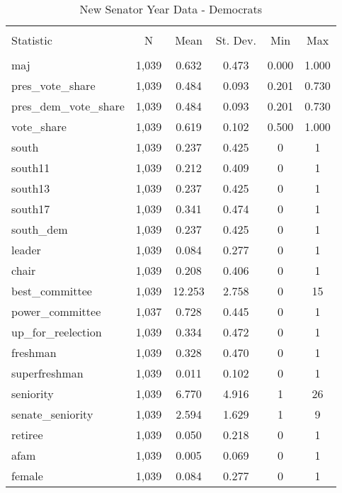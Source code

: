 \documentclass[12pt]{article}
\begin{document}
\begin{table}[!htbp] \centering 
	\caption{New Senator Year Data - Democrats} 
	\begin{tabular}{@{\extracolsep{5pt}}lccccc} 
		\\[-1.8ex]\hline 
		\hline \\[-1.8ex] 
		Statistic & \multicolumn{1}{c}{N} & \multicolumn{1}{c}{Mean} & \multicolumn{1}{c}{St. Dev.} & \multicolumn{1}{c}{Min} & \multicolumn{1}{c}{Max} \\ 
		\hline \\[-1.8ex]  
		maj & 1,039 & 0.632 & 0.473 & 0.000 & 1.000 \\ 
		pres\_vote\_share & 1,039 & 0.484 & 0.093 & 0.201 & 0.730 \\ 
		pres\_dem\_vote\_share & 1,039 & 0.484 & 0.093 & 0.201 & 0.730 \\ 
		vote\_share & 1,039 & 0.619 & 0.102 & 0.500 & 1.000 \\ 
		south & 1,039 & 0.237 & 0.425 & 0 & 1 \\ 
		south11 & 1,039 & 0.212 & 0.409 & 0 & 1 \\ 
		south13 & 1,039 & 0.237 & 0.425 & 0 & 1 \\ 
		south17 & 1,039 & 0.341 & 0.474 & 0 & 1 \\ 
		south\_dem & 1,039 & 0.237 & 0.425 & 0 & 1 \\ 
		leader & 1,039 & 0.084 & 0.277 & 0 & 1 \\ 
		chair & 1,039 & 0.208 & 0.406 & 0 & 1 \\ 
		best\_committee & 1,039 & 12.253 & 2.758 & 0 & 15 \\ 
		power\_committee & 1,037 & 0.728 & 0.445 & 0 & 1 \\ 
		up\_for\_reelection & 1,039 & 0.334 & 0.472 & 0 & 1 \\ 
		freshman & 1,039 & 0.328 & 0.470 & 0 & 1 \\ 
		superfreshman & 1,039 & 0.011 & 0.102 & 0 & 1 \\ 
		seniority & 1,039 & 6.770 & 4.916 & 1 & 26 \\ 
		senate\_seniority & 1,039 & 2.594 & 1.629 & 1 & 9 \\ 
		retiree & 1,039 & 0.050 & 0.218 & 0 & 1 \\ 
		afam & 1,039 & 0.005 & 0.069 & 0 & 1 \\ 
		female & 1,039 & 0.084 & 0.277 & 0 & 1 \\ 

\end{tabular}
\end{table}
\end{document}
